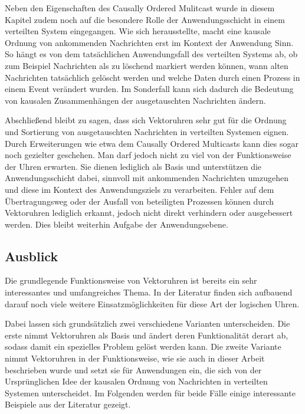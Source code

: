 Neben den Eigenschaften des Causally Ordered Mulitcast wurde in diesem Kapitel zudem noch auf die besondere Rolle der Anwendungsschicht in einem verteilten System eingegangen. Wie sich herausstellte, macht eine kausale Ordnung von ankommenden Nachrichten erst im Kontext der Anwendung Sinn. So hängt es von dem tatsächlichen Anwendungsfall des verteilten Systems ab, ob zum Beispiel Nachrichten als zu löschend markiert werden können, wann alten Nachrichten tatsächlich gelöscht werden und welche Daten durch einen Prozess in einem Event verändert wurden. Im Sonderfall kann sich dadurch die Bedeutung von kausalen Zusammenhängen der ausgetauschten Nachrichten ändern.

Abschließend bleibt zu sagen, dass sich Vektoruhren sehr gut für die Ordnung und Sortierung von ausgetauschten Nachrichten in verteilten Systemen eignen. Durch Erweiterungen wie etwa dem Causally Ordered Multicasts kann dies sogar noch gezielter geschehen. Man darf jedoch nicht zu viel von der Funktionsweise der Uhren erwarten. Sie dienen lediglich als Basis und unterstützen die Anwendungsschicht dabei, sinnvoll mit ankommenden Nachrichten umzugehen und diese im Kontext des Anwendungsziels zu verarbeiten. Fehler auf dem Übertragungsweg oder der Ausfall von beteiligten Prozessen können durch Vektoruhren lediglich erkannt, jedoch nicht direkt verhindern oder ausgebessert werden. Dies bleibt weiterhin Aufgabe der Anwendungsebene.
\subsection{Ausblick}
Die grundlegende Funktionsweise von Vektoruhren ist bereits ein sehr interessantes und umfangreiches Thema. In der Literatur finden sich aufbauend darauf noch viele weitere Einsatzmöglichkeiten für diese Art der logischen Uhren.

Dabei lassen sich grundsätzlich zwei verschiedene Varianten unterscheiden. Die erste nimmt Vektoruhren als Basis und ändert deren Funktionalität derart ab, sodass damit ein spezielles Problem gelöst werden kann. Die zweite Variante nimmt Vektoruhren in der Funktionsweise, wie sie auch in dieser Arbeit beschrieben wurde und setzt sie für Anwendungen ein, die sich von der Ursprünglichen Idee der kausalen Ordnung von Nachrichten in verteilten Systemen unterscheidet. Im Folgenden werden für beide Fälle einige interessante Beispiele aus der Literatur gezeigt.

